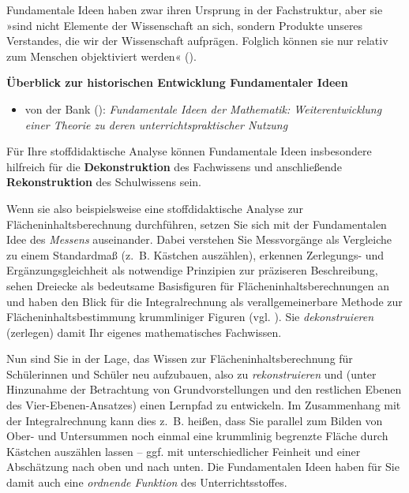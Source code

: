 \documentclass[
]{scrbook}
\providecommand{\tightlist}{%
  \setlength{\itemsep}{0pt}\setlength{\parskip}{0pt}}
\renewenvironment{quote}{
  \list{}{
	\leftmargin0.2cm   %
    \rightmargin\leftmargin
      	\def\FrameCommand
    {%
        {\color{quoteColor}\vrule width 2pt}%
        \hspace{0pt}%
    }%
    \MakeFramed{\advance \hsize -\width \FrameRestore}    \color{quoteColor}
    }
  \item\relax
}
{\endlist\color{black}\endMakeFramed}
\theoremstyle{definition}
\theoremstyle{definition}
\theoremstyle{definition}
\theoremstyle{definition}
\theoremstyle{remark}
\begin{document}
Fundamentale Ideen haben zwar ihren Ursprung in der Fachstruktur, aber sie »sind nicht Elemente der Wissenschaft an sich, sondern Produkte unseres Verstandes, die wir der Wissenschaft aufprägen. Folglich können sie nur relativ zum Menschen objektiviert werden« ().

\begin{quote}
\textbf{Überblick zur historischen Entwicklung Fundamentaler Ideen}

\begin{itemize}
\tightlist
\item
  von der Bank (): \emph{Fundamentale Ideen der Mathematik: Weiterentwicklung einer Theorie zu deren unterrichtspraktischer Nutzung}
\end{itemize}
\end{quote}

Für Ihre stoffdidaktische Analyse können Fundamentale Ideen insbesondere hilfreich für die \textbf{Dekonstruktion} des Fachwissens und anschließende \textbf{Rekonstruktion} des Schulwissens sein.

Wenn sie also beispielsweise eine stoffdidaktische Analyse zur Flächeninhaltsberechnung durchführen, setzen Sie sich mit der Fundamentalen Idee des \emph{Messens} auseinander. Dabei verstehen Sie Messvorgänge als Vergleiche zu einem Standardmaß (z.~B. Kästchen auszählen), erkennen Zerlegungs- und Ergänzungsgleichheit als notwendige Prinzipien zur präziseren Beschreibung, sehen Dreiecke als bedeutsame Basisfiguren für Flächeninhaltsberechnungen an und haben den Blick für die Integralrechnung als verallgemeinerbare Methode zur Flächeninhaltsbestimmung krummliniger Figuren (vgl. ). Sie \emph{dekonstruieren} (zerlegen) damit Ihr eigenes mathematisches Fachwissen.

Nun sind Sie in der Lage, das Wissen zur Flächeninhaltsberechnung für Schülerinnen und Schüler neu aufzubauen, also zu \emph{rekonstruieren} und (unter Hinzunahme der Betrachtung von Grundvorstellungen und den restlichen Ebenen des Vier-Ebenen-Ansatzes) einen Lernpfad zu entwickeln. Im Zusammenhang mit der Integralrechnung kann dies z.~B. heißen, dass Sie parallel zum Bilden von Ober- und Untersummen noch einmal eine krummlinig begrenzte Fläche durch Kästchen auszählen lassen -- ggf. mit unterschiedlicher Feinheit und einer Abschätzung nach oben und nach unten. Die Fundamentalen Ideen haben für Sie damit auch eine \emph{ordnende Funktion} des Unterrichtsstoffes.
\end{document}
